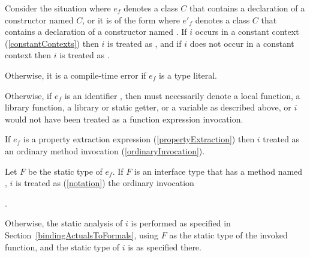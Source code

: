 \documentclass[makeidx]{article}
\begin{document}
{\LMHash{}%
Consider the situation where $e_f$ denotes a class $C$
that contains a declaration of a constructor named $C$,
or it is of the form  where
$e'_f$ denotes a class $C$ that contains a declaration of
a constructor named .
If $i$ occurs in a constant context
(\ref{constantContexts})
then $i$ is treated as ,
and if $i$ does not occur in a constant context
then $i$ is treated as .


\LMHash{}%
Otherwise, it is a compile-time error if $e_f$ is a type literal.


\LMHash{}%
Otherwise, if $e_f$ is an identifier \id, then \id{} must necessarily denote
a local function, a library function, a library or static getter,
or a variable as described above,
or $i$ would not have been treated as a function expression invocation.

\LMHash{}%
If $e_f$ is a property extraction expression
(\ref{propertyExtraction})
then $i$ treated as an ordinary method invocation
(\ref{ordinaryInvocation}).


\LMHash{}%
Let $F$ be the static type of $e_f$.
If $F$ is an interface type that has a method named \CALL,
$i$ is treated as
(\ref{notation})
the ordinary invocation

\noindent
{}.

\LMHash{}%
Otherwise, the static analysis of $i$ is performed as specified
in Section~\ref{bindingActualsToFormals},
using $F$ as the static type of the invoked function,
and the static type of $i$ is as specified there.

}
\end{document}

